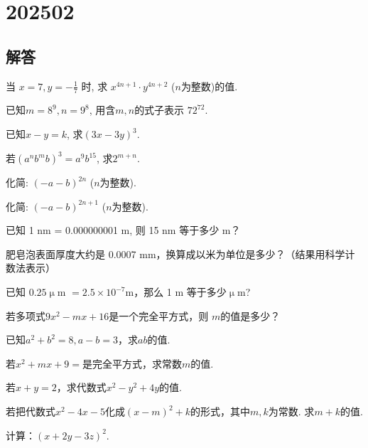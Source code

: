 \section{202502}

\subsection{解答}
\item{
    当 $ x=7, y=-\frac{1}{7}$ 时, 求 $x^{4n+1}\cdot y^{4n+2}$ ($n$为整数)的值.
} 
\\
\item{
    已知$ m=8^9, n=9^8 $, 用含$m, n$的式子表示 $72^{72}$.
} 
\\
\item{
    已知$x-y=k$, 求$(3x-3y)^3.$
} 
\\
\item{
    若$(a^nb^mb)^3 = a^9 b^{15}$, 求$2^{m+n}$.
}
\\
\item{
    化简: $(-a-b)^{2n}$ ($n$为整数).
}
\\
\item{
    化简: $(-a-b)^{2n+1}$ ($n$为整数).
}
\\
\item{
    已知 1 nm = 0.000000001 m, 则 15 nm 等于多少 m？
}
\\
\item{
    肥皂泡表面厚度大约是 0.0007 mm，换算成以米为单位是多少？（结果用科学计数法表示）
}
\\
\item{
    已知 $0.25 \upmu$m $ = 2.5\times 10^{-7}$m，那么 1 m 等于多少$\upmu$m?
}
\\
\item{
    若多项式$ 9x^2 - mx+16$是一个完全平方式，则 $m$的值是多少？
}
\\
\item{
    已知$a^2+b^2=8, a-b=3$，求$ab$的值.
}
\\
\item{
    若$x^2+mx+9=$是完全平方式，求常数$m$的值.
}
\\
\item{
    若$x+y=2$，求代数式$x^2-y^2+4y$的值.
}
\\
\item{
    若把代数式$x^2-4x-5$化成$(x-m)^2+k$的形式，其中$m,k$为常数. 求$m+k$的值.
}
\\
\item{
    计算：$(x+2y-3z)^2$.
}